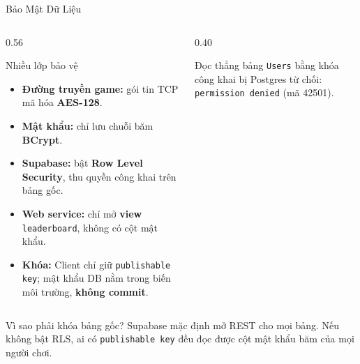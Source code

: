 \begin{frame}{Bảo Mật Dữ Liệu}
  \begin{columns}[T]
    \begin{column}{0.56\textwidth}
      \begin{block}{Nhiều lớp bảo vệ}
        \footnotesize
        \begin{itemize}
          \item \textbf{Đường truyền game:} gói tin TCP mã hóa \textbf{AES-128}.
          \item \textbf{Mật khẩu:} chỉ lưu chuỗi băm \textbf{BCrypt}.
          \item \textbf{Supabase:} bật \textbf{Row Level Security}, thu quyền công khai trên bảng gốc.
          \item \textbf{Web service:} chỉ mở \textbf{view} \texttt{leaderboard}, không có cột mật khẩu.
          \item \textbf{Khóa:} Client chỉ giữ \texttt{publishable key}; mật khẩu DB nằm trong biến môi trường, \textbf{không commit}.
        \end{itemize}
      \end{block}
    \end{column}
    \begin{column}{0.40\textwidth}
      \centering
      \par\vspace{2pt}\scriptsize Đọc thẳng bảng \texttt{Users} bằng khóa công khai bị Postgres từ chối: \texttt{permission denied} (mã 42501).
    \end{column}
  \end{columns}
  \vspace{0.1cm}
  \begin{alertblock}{Vì sao phải khóa bảng gốc?}
    \footnotesize Supabase mặc định mở REST cho mọi bảng. Nếu không bật RLS, ai có \texttt{publishable key} đều đọc được cột mật khẩu băm của mọi người chơi.
  \end{alertblock}
\end{frame}
